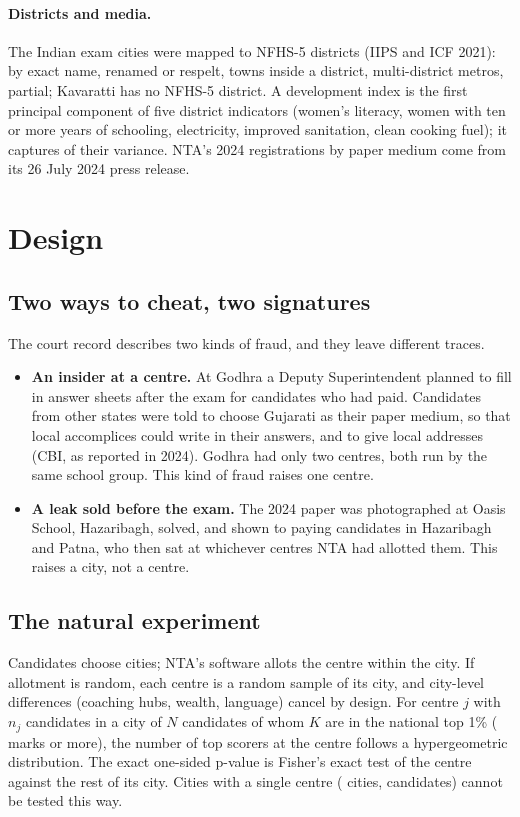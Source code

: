 \documentclass[11pt]{article}
\begin{document}
\paragraph{Districts and media.} The \CitiesIndia{} Indian exam cities were mapped to NFHS-5 districts (IIPS and ICF 2021): \MapExact{} by exact name, \MapAlias{} renamed or respelt, \MapTown{} towns inside a district, \MapMulti{} multi-district metros, \MapPartial{} partial; Kavaratti has no NFHS-5 district. A development index is the first principal component of five district indicators (women's literacy, women with ten or more years of schooling, electricity, improved sanitation, clean cooking fuel); it captures \DevPcOneShare{} of their variance. NTA's 2024 registrations by paper medium come from its 26 July 2024 press release.

\section{Design}\label{sec:design}
\subsection{Two ways to cheat, two signatures}
The court record describes two kinds of fraud, and they leave different traces.
\begin{itemize}[leftmargin=1.2em]
\item \textbf{An insider at a centre.} At Godhra a Deputy Superintendent planned to fill in answer sheets after the exam for candidates who had paid. Candidates from other states were told to choose Gujarati as their paper medium, so that local accomplices could write in their answers, and to give local addresses (CBI, as reported in 2024). Godhra had only two centres, both run by the same school group. This kind of fraud raises one centre.
\item \textbf{A leak sold before the exam.} The 2024 paper was photographed at Oasis School, Hazaribagh, solved, and shown to paying candidates in Hazaribagh and Patna, who then sat at whichever centres NTA had allotted them. This raises a city, not a centre.
\end{itemize}

\subsection{The natural experiment}
Candidates choose cities; NTA's software allots the centre within the city. If allotment is random, each centre is a random sample of its city, and city-level differences (coaching hubs, wealth, language) cancel by design. For centre $j$ with $n_j$ candidates in a city of $N$ candidates of whom $K$ are in the national top 1\% (\TTopOne{} marks or more), the number of top scorers at the centre follows a hypergeometric distribution. The exact one-sided p-value is Fisher's exact test of the centre against the rest of its city. Cities with a single centre (\SingleCentreCities{} cities, \SingleCentreCandidates{} candidates) cannot be tested this way.
\end{document}
